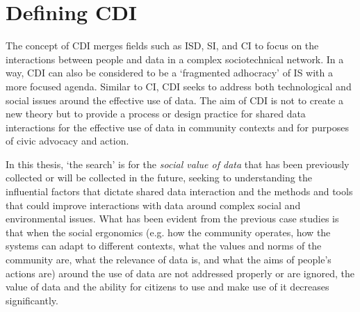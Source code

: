\section{Defining CDI}
The concept of CDI merges fields such as ISD, SI, and CI to focus on the interactions between people and data in a complex sociotechnical network. In a way, CDI can also be considered to be a `fragmented adhocracy' of IS \citep{stillman_community_2009} with a more focused agenda. Similar to CI, CDI seeks to address both technological and social issues around the effective use of data. The aim of CDI is not to create a new theory but to provide a process or design practice for shared data interactions for the effective use of data in community contexts and for purposes of civic advocacy and action.

In this thesis, `the search' is for the \textit{social value of data} that has been previously collected or will be collected in the future, seeking to understanding the influential factors that dictate shared data interaction and the methods and tools that could improve interactions with data around complex social and environmental issues. What has been evident from the previous case studies is that when the social ergonomics \citep{brown_issues_1985} (e.g. how the community operates, how the systems can adapt to different contexts, what the values and norms of the community are, what the relevance of data is, and what the aims of people's actions are) around the use of data are not addressed properly or are ignored, the value of data and the ability for citizens to use and make use of it decreases significantly.

